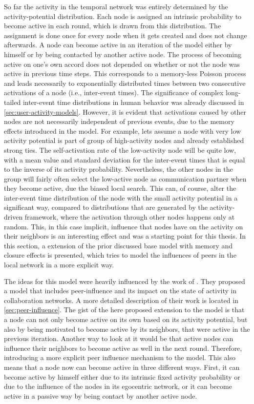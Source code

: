 So far the activity in the temporal network was entirely determined by the activity-potential distribution.
Each node is assigned an intrinsic probability to become active in each round, which is drawn from this distribution.
The assignment is done once for every node when it gets created and does not change afterwards.
A node can become active in an iteration of the model either by himself or by being contacted by another active node.
The process of becoming active on one's own accord does not depended on whether or not the node was active in previous time steps.
This corresponds to a memory-less Poisson process and leads necessarily to exponentially distributed times between two consecutive activations of a node (i.e., inter-event times).
The significance of complex long-tailed inter-event time distributions in human behavior was already discussed in \autoref{sec:user-activity-models}.
However, it is evident that activations caused by other nodes are not necessarily independent of previous events, due to the memory effects introduced in the model.
For example, lets assume a node with very low activity potential is part of group of high-activity nodes and already established strong ties.
The self-activation rate of the low-activity node will be quite low, with a mean value and standard deviation for the inter-event times that is equal to the inverse of its activity probability.
Nevertheless, the other nodes in the group will fairly often select the low-active node as communication partner when they become active, due the biased local search.
This can, of course, alter the inter-event time distribution of the node with the small activity potential in a significant way, compared to distributions that are generated by the activity-driven framework, where the activation through other nodes happens only at random.
This, in this case implicit, influence that nodes have on the activity on their neighbors is an interesting effect and was a starting point for this thesis.
In this section, a extension of the prior discussed base model with memory and closure effects is presented, which tries to model the influences of peers in the local network in a more explicit way.

The ideas for this model were heavily influenced by the work of \citet{Walk2016}.
They proposed a model that includes peer-influence and its impact on the state of activity in collaboration networks.
A more detailed description of their work is located in \autoref{sec:peer-influence}.
The gist of the here proposed extension to the model is that a node can not only become active on its own based on its activity potential, but also by being motivated to become active by its neighbors, that were active in the previous iteration.
Another way to look at it would be that active nodes can influence their neighbors to become active as well in the next round.
Therefore, introducing a more explicit peer influence mechanism to the model.
This also means that a node now can become active in three different ways.
First, it can become active by himself either due to its intrinsic fixed activity probability or due to the influence of the nodes in its egocentric network, or it can become active in a passive way by being contact by another active node.

